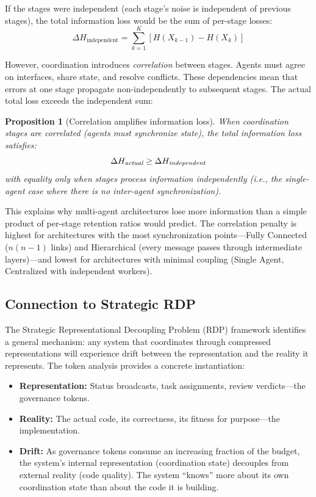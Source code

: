 \documentclass[11pt,a4paper]{article}
\newtheorem{proposition}{Proposition}
\begin{document}
If the stages were independent (each stage's noise is independent of previous stages), the total information loss would be the sum of per-stage losses:
\begin{equation}
\label{eq:independent-loss}
\Delta H_{\text{independent}} = \sum_{k=1}^{K} [H(X_{k-1}) - H(X_k)]
\end{equation}

However, coordination introduces \emph{correlation} between stages. Agents must agree on interfaces, share state, and resolve conflicts. These dependencies mean that errors at one stage propagate non-independently to subsequent stages. The actual total loss exceeds the independent sum:

\begin{proposition}[Correlation amplifies information loss]
\label{prop:correlated-loss}
When coordination stages are correlated (agents must synchronize state), the total information loss satisfies:
\begin{equation}
\Delta H_{\emph{actual}} \geq \Delta H_{\emph{independent}}
\end{equation}
with equality only when stages process information independently (i.e., the single-agent case where there is no inter-agent synchronization).
\end{proposition}

This explains why multi-agent architectures lose more information than a simple product of per-stage retention ratios would predict. The correlation penalty is highest for architectures with the most synchronization points---Fully Connected ($n(n-1)$ links) and Hierarchical (every message passes through intermediate layers)---and lowest for architectures with minimal coupling (Single Agent, Centralized with independent workers).

\subsection{Connection to Strategic RDP}

The Strategic Representational Decoupling Problem (RDP) framework \citep{mcentire2025channel} identifies a general mechanism: any system that coordinates through compressed representations will experience drift between the representation and the reality it represents. The token analysis provides a concrete instantiation:

\begin{itemize}
\item \textbf{Representation:} Status broadcasts, task assignments, review verdicts---the governance tokens.
\item \textbf{Reality:} The actual code, its correctness, its fitness for purpose---the implementation.
\item \textbf{Drift:} As governance tokens consume an increasing fraction of the budget, the system's internal representation (coordination state) decouples from external reality (code quality). The system ``knows'' more about its own coordination state than about the code it is building.
\end{itemize}
\end{document}
